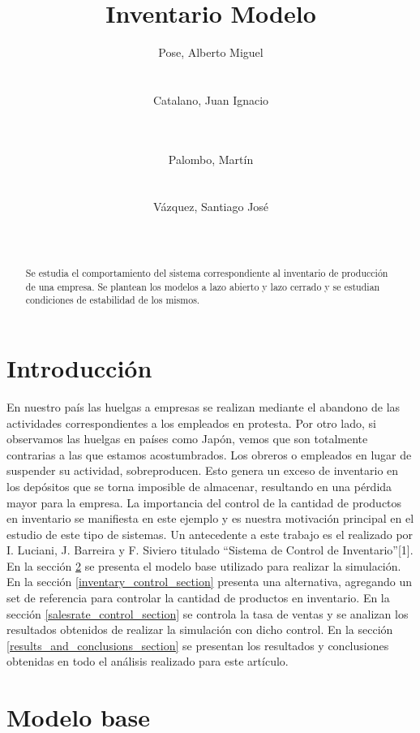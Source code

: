 \documentclass{sig-alternate}
\title{Inventario Modelo}
\author{
\alignauthor
Pose, Alberto Miguel\\
       \affaddr{Instituto Tecnológico de Buenos Aires}\\
       \affaddr{Buenos Aires, Argentina}\\
       \email{apose@alu.itba.edu.ar}
\alignauthor
Catalano, Juan Ignacio\\
       \affaddr{Instituto Tecnológico de Buenos Aires}\\
       \affaddr{Buenos Aires, Argentina}\\
       \email{jcatalan@alu.itba.edu.ar}
\and
\alignauthor 
Palombo, Martín\\
       \affaddr{Instituto Tecnológico de Buenos Aires}\\
       \affaddr{Buenos Aires, Argentina}\\
       \email{mpalombo@alu.itba.edu.ar}
\alignauthor 
Vázquez, Santiago José\\
       \affaddr{Instituto Tecnológico de Buenos Aires}\\
       \affaddr{Buenos Aires, Argentina}\\
       \email{savazque@alu.itba.edu.ar}
}
\date{}
\begin{document}
\maketitle

\begin{abstract}
Se estudia el comportamiento del sistema correspondiente al inventario de producción de una empresa. Se plantean los modelos a lazo abierto y
lazo cerrado y se estudian condiciones de estabilidad de los mismos.
\end{abstract}

\section{Introducción}
En nuestro país las huelgas a empresas se realizan mediante el abandono de las actividades correspondientes a los empleados en protesta. Por otro
lado, si observamos las huelgas en países como Japón, vemos que son totalmente contrarias a las que estamos acostumbrados. Los obreros o empleados
en lugar de suspender su actividad, sobreproducen. Esto genera un exceso de inventario en los depósitos que se torna imposible de almacenar,
resultando en una pérdida mayor para la empresa. La importancia del control de la cantidad de productos en inventario se manifiesta en este
ejemplo y es nuestra motivación principal en el estudio de este tipo de sistemas. Un antecedente a este trabajo es el realizado por I. Luciani, J. Barreira y
F. Siviero titulado ``Sistema de Control de Inventario''[1].\\ 
En la sección \ref{model_section} se presenta el modelo base utilizado para realizar la simulación. En la sección \ref{inventary_control_section} presenta una alternativa, 
agregando un set de referencia para controlar la cantidad de productos en inventario. En la sección \ref{salesrate_control_section} se controla
la tasa de ventas y se analizan los resultados obtenidos de realizar la simulación con dicho control. En la sección \ref{results_and_conclusions_section}
se presentan los resultados y conclusiones obtenidas en todo el análisis realizado para este artículo.

\section{Modelo base}
\label{model_section}
\end{document}
